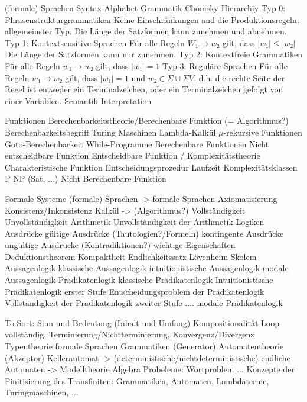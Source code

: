 \documentclass{scrartcl}
\begin{document}
(formale) Sprachen
	Syntax
		Alphabet
		Grammatik 
		Chomsky Hierarchiy
			Typ 0: Phrasenstrukturgrammatiken
				Keine Einschränkungen and die Produktionsregeln; 
				allgemeinster Typ.
				Die Länge der Satzformen kann zunehmen und abnehmen.
			Typ 1: Kontextsensitive Sprachen
				Für alle Regeln $W₁ → w₂$ gilt, dass $|w₁| ≤ |w₂|$
				Die Länge der Satzformen kann nur zunehmen.
			Typ 2: Kontextfreie Grammatiken
				Für alle Regeln $w₁ → w₂$ gilt, dass $|w₁| = 1$
			Typ 3: Reguläre Sprachen
				Für alle Regeln $w₁ → w₂$ gilt, dass
				$|w₁| = 1$ und $w₂ ∈ Σ ∪ ΣV$, d.h. die rechte Seite
				der Regel ist entweder ein Terminalzeichen, oder ein
				Terminalzeichen gefolgt von einer Variablen.
	Semantik
	Interpretation

Funktionen
	Berechenbarkeitstheorie/Berechenbare Funktion (= Algorithmus?)
		Berechenbarkeitsbegriff
		    Turing Maschinen
		    Lambda-Kalkül
		    $μ$-rekursive Funktionen
			Goto-Berechenbarkeit
			While-Programme
		Berechenbare Funktionen
			Nicht entscheidbare Funktion
			Entscheidbare Funktion / Komplexitätstheorie 
				Charakteristische Funktion
				Entscheidungsprozedur
				Laufzeit
				Komplexitätsklassen
					P 
					NP (Sat, ...)
		Nicht Berechenbare Funktion

Formale Systeme
	(formale) Sprachen -> formale Sprachen
	Axiomatisierung
	Konsistenz/Inkonsistenz
	Kalkül -> (Algorithmus?)
	Vollständigkeit
	Unvollständigkeit
	Arithmetik
		Unvollständigkeit der Arithmetik
	Logiken
		Ausdrücke
			gültige Ausdrücke (Tautologien?/Formeln)
			kontingente Ausdrücke
			ungültige Ausdrücke (Kontradiktionen?)
		wichtige Eigenschaften
			Deduktionstheorem
			Kompaktheit
			Endlichkeitssatz
			Lövenheim-Skolem
		Aussagenlogik
			klassische Aussagenlogik
			intuitionistische Aussagenlogik
			modale Aussagenlogik
		Prädikatenlogik
			klassische Prädikatenlogik
			Intuitionistische Prädikatenlogik
			erster Stufe
				Entscheidungsproblem der Prädikatenlogik
				Vollständigkeit der Prädikatenlogik
			zweiter Stufe
			....
			modale Prädikatenlogik

To Sort: 
Sinn und Bedeutung (Inhalt und Umfang)
Kompositionalität
Loop vollständig,
Terminierung/Nichtterminierung, Konvergenz/Divergenz
Typentheorie
formale Sprachen
	Grammatiken (Generator)
	Automatentheorie (Akzeptor)
		Kellerautomat -> 
		(deterministische/nichtdeterministische) endliche Automaten -> 
Modelltheorie
Algebra
Probeleme:
	Wortproblem
	...
Konzepte der Finitisierung des Transfiniten:
Grammatiken, Automaten, Lambdaterme, Turingmaschinen, ...
\end{document}
